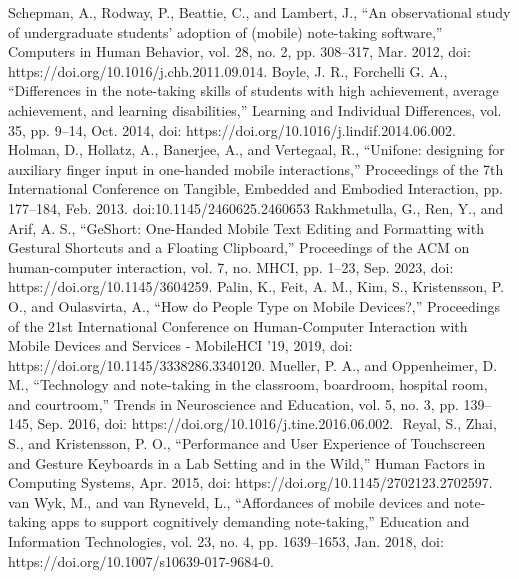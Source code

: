 \documentclass[conference]{IEEEtran}
\begin{document}
\begin{thebibliography}{00}
 Schepman, A., Rodway, P., Beattie, C., and Lambert, J., “An observational study of undergraduate students’ adoption of (mobile) note-taking software,” Computers in Human Behavior, vol. 28, no. 2, pp. 308–317, Mar. 2012, doi: https://doi.org/10.1016/j.chb.2011.09.014.
 Boyle, J. R., Forchelli G. A., “Differences in the note-taking skills of students with high achievement, average achievement, and learning disabilities,” Learning and Individual Differences, vol. 35, pp. 9–14, Oct. 2014, doi: https://doi.org/10.1016/j.lindif.2014.06.002.
 Holman, D., Hollatz, A., Banerjee, A., and Vertegaal, R., “Unifone: designing for auxiliary finger input in one-handed mobile interactions,” Proceedings of the 7th International Conference on Tangible, Embedded and Embodied Interaction, pp. 177–184, Feb. 2013. doi:10.1145/2460625.2460653 
 Rakhmetulla, G., Ren, Y., and Arif, A. S., “GeShort: One-Handed Mobile Text Editing and Formatting with Gestural Shortcuts and a Floating Clipboard,” Proceedings of the ACM on human-computer interaction, vol. 7, no. MHCI, pp. 1–23, Sep. 2023, doi: https://doi.org/10.1145/3604259.
 Palin, K., Feit, A. M., Kim, S., Kristensson, P. O., and Oulasvirta, A., “How do People Type on Mobile Devices?,” Proceedings of the 21st International Conference on Human-Computer Interaction with Mobile Devices and Services - MobileHCI ’19, 2019, doi: https://doi.org/10.1145/3338286.3340120.
 Mueller, P. A., and Oppenheimer, D. M., “Technology and note-taking in the classroom, boardroom, hospital room, and courtroom,” Trends in Neuroscience and Education, vol. 5, no. 3, pp. 139–145, Sep. 2016, doi: https://doi.org/10.1016/j.tine.2016.06.002.
‌
 Reyal, S., Zhai, S., and Kristensson, P. O., “Performance and User Experience of Touchscreen and Gesture Keyboards in a Lab Setting and in the Wild,” Human Factors in Computing Systems, Apr. 2015, doi: https://doi.org/10.1145/2702123.2702597.
 van Wyk, M., and van Ryneveld, L., “Affordances of mobile devices and note-taking apps to support cognitively demanding note-taking,” Education and Information Technologies, vol. 23, no. 4, pp. 1639–1653, Jan. 2018, doi: https://doi.org/10.1007/s10639-017-9684-0.
‌

\end{thebibliography}
\end{document}
